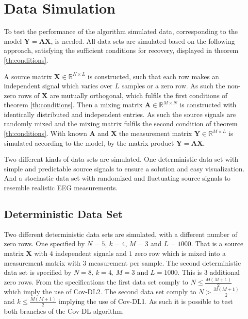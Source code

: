 \section{Data Simulation}\label{sec:dataset}
To test the performance of the algorithm simulated data, corresponding to the model $\mathbf{Y} = \mathbf{A}\mathbf{X}$, is needed. All data sets are simulated based on the following approach, satisfying the sufficient conditions for recovery, displayed in theorem \ref{th:conditions}.
 
A source matrix $\mathbf{X} \in \mathbb{R}^{N \times L}$ is constructed, such that each row makes an independent signal which varies over $L$ samples or a zero row. 
As such the non-zero rows of $\mathbf{X}$ are mutually orthogonal, which fulfils the first conditions of theorem \ref{th:conditions}.   
Then a mixing matrix $\mathbf{A} \in \mathbb{R}^{M \times N}$ is constructed with identically distributed and independent entries. 
As such the source signals are randomly mixed and the mixing matrix fulfils the second condition of theorem \ref{th:conditions}.
With known $\mathbf{A}$ and $\mathbf{X}$ the measurement matrix $\mathbf{Y} \in \mathbb{R}^{M \times L}$ is simulated according to the model, by the matrix product $\mathbf{Y} = \mathbf{AX}$.  

Two different kinds of data sets are simulated.
One deterministic data set with simple and predictable source signals to ensure a solution and easy visualization.
And a stochastic data set with randomized and fluctuating source signals to resemble realistic EEG measurements.

\subsection{Deterministic Data Set}\label{subseg_simpledata}
Two different deterministic data sets are simulated, with a different number of zero rows. 
One specified by $N = 5$, $k = 4$, $M = 3$ and $L = 1000$. That is a source matrix $\mathbf{X}$ with $4$ independent signals and $1$ zero row which is mixed into a measurement matrix with $3$ measurement per sample.  
The second deterministic data set is specified by $N = 8$, $k = 4$, $M = 3$ and $L = 1000$. This is 3 additional zero rows.
From the specifications the first data set comply to $N \leq \frac{M(M+1)}{2}$ which imply the use of Cov-DL2.
The second data set comply to $N > \frac{M(M+1)}{2}$ and $k \leq \frac{M(M+1)}{2}$ implying the use of Cov-DL1. 
As such it is possible to test both branches of the Cov-DL algorithm. 
     
